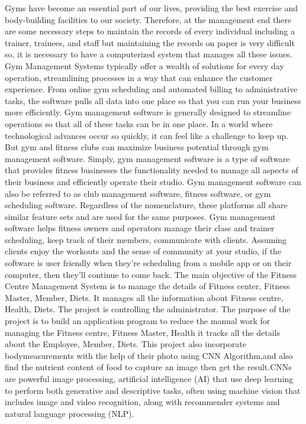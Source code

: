 \documentclass[a4paper,12pt,toc=flat]{report}
\begin{document}
	\hspace*{12pt}Gyms have become an essential part of our lives, providing the best exercise and body-building facilities to our society. Therefore, at the management end there are some necessary steps to maintain the records of every individual including a trainer, trainees, and staff but maintaining the records on paper is very difficult so, it is necessary to have a computerized system that manages all these issues. Gym Management Systems typically offer a wealth of solutions for every day operation, streamlining processes in a way that can enhance the customer experience. From online gym scheduling and automated billing to administrative tasks, the software pulls all data into one place so that you can run your business more efficiently. Gym management software is generally designed to streamline operations so that all of these tasks can be in one place. In a world where technological advances occur so quickly, it can feel like a challenge to keep up. But gym and fitness clubs can maximize business potential through gym management software. Simply, gym management software is a type of software that provides fitness businesses the functionality needed to manage all aspects of their business and efficiently operate their studio. Gym management software can also be referred to as club management software, fitness software, or gym scheduling software. Regardless of the nomenclature, these platforms all share similar feature sets and are used for the same purposes. Gym management software helps fitness owners and operators manage their class and trainer scheduling, keep track of their members, communicate with clients. Assuming clients enjoy the workouts and the sense of community at your studio, if the software is user friendly when they’re scheduling from a mobile app or on their computer, then they’ll continue to come back. The main objective of the Fitness Centre Management System is to manage the details of Fitness center, Fitness Master,  Member, Diets. It manages all the information about Fitness centre, Health, Diets. The project is controlling the administrator. The purpose of the project is to build an application program to reduce the manual work for managing the Fitness centre, Fitness Master, Health it tracks all the details about the Employee, Member, Diets. This project also incorporate bodymeasurements with the help of their photo using CNN Algorithm,and also find the nutrient content of food to capture an image then get the result.CNNs are powerful image processing, artificial intelligence (AI) that use deep learning to perform both generative and descriptive tasks, often using machine vision that includes image and video recognition, along with recommender systems and natural language processing (NLP). 
\end{document}
